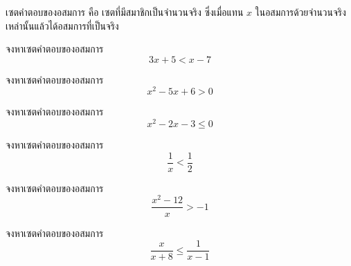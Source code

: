 \vspace{0.5em}
เซตคำตอบของอสมการ คือ เซตที่มีสมาชิกเป็นจำนวนจริง ซึ่งเมื่อแทน $x$ ในอสมการด้วยจำนวนจริงเหล่านั้นแล้วได้อสมการที่เป็นจริง

\begin{examplebox}
	จงหาเซตคำตอบของอสมการ 
	$$3x + 5 < x - 7$$
\end{examplebox}
\solution
\newpage

\begin{examplebox}
	จงหาเซตคำตอบของอสมการ 
	$$x^2 - 5x + 6 > 0$$
\end{examplebox}
\solution
\newpage

\begin{examplebox}
	จงหาเซตคำตอบของอสมการ 
	$$x^2 - 2x - 3 \leq 0$$
\end{examplebox}
\solution
\newpage

\begin{examplebox}
	จงหาเซตคำตอบของอสมการ 
	$$\dfrac{1}{x} < \dfrac{1}{2}$$
\end{examplebox}
\solution
\newpage

\begin{examplebox}
	จงหาเซตคำตอบของอสมการ 
	$$\dfrac{x^2 - 12}{x} > -1$$
\end{examplebox}
\solution
\newpage

\begin{examplebox}
	จงหาเซตคำตอบของอสมการ 
	$$\dfrac{x}{x+8} \leq \dfrac{1}{x-1}$$
\end{examplebox}
\solution
\newpage
